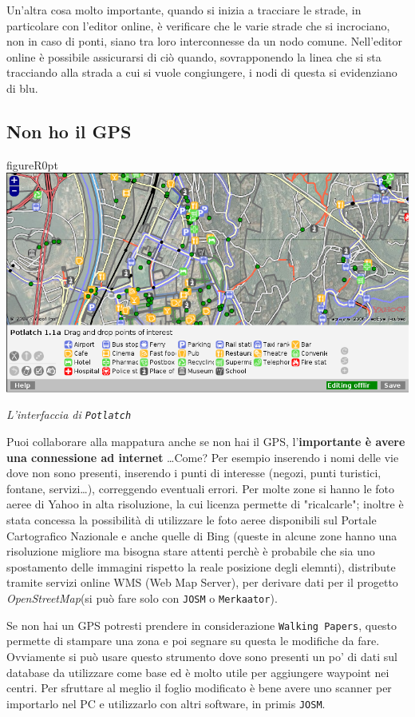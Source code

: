 \documentclass[a4paper,twoside,12pt,]{article}
\newcommand{\osm}{\emph{OpenStreetMap}\xspace}
\newcommand{\gps}{GPS\xspace}
\newcommand{\soft}[1]{\texttt{#1}}
\begin{document}
Un'altra cosa molto importante, quando si inizia a tracciare le strade, in particolare con l'editor online, è verificare che le varie strade che si incrociano, non in caso di ponti, siano tra loro interconnesse da un nodo comune. Nell'editor online è possibile assicurarsi di ciò quando, sovrapponendo la linea che si sta tracciando alla strada a cui si vuole congiungere, i nodi di questa si evidenziano di blu.
\subsection{Non ho il \gps}
\begin{wrapfloat}{figure}{R}{0pt}
 \includegraphics[width=0.7\columnwidth]{potlatch.png}
 \caption{\textit{L'interfaccia di \soft{Potlatch}}}
\end{wrapfloat}
Puoi collaborare alla mappatura anche se non hai il \gps, l'\textbf{importante è avere una connessione ad internet} \dots Come? Per esempio inserendo i nomi delle vie dove non sono presenti, inserendo i punti di interesse (negozi, punti turistici, fontane, servizi\dots), correggendo eventuali errori. Per molte zone si hanno le foto aeree di Yahoo in alta risoluzione, la cui licenza permette di "ricalcarle"; inoltre è stata concessa la possibilità di utilizzare le foto aeree disponibili sul Portale Cartografico Nazionale e anche quelle di Bing (queste in alcune zone hanno una risoluzione migliore ma bisogna stare attenti perchè è probabile che sia uno spostamento delle immagini rispetto la reale posizione degli elemnti), distribute tramite servizi online WMS (Web Map Server), per derivare dati per il progetto \osm (si può fare solo con \soft{JOSM} o \soft{Merkaator}). 

Se non hai un \gps potresti prendere in considerazione \soft{Walking Papers}, questo permette di stampare una zona e poi segnare su questa le modifiche da fare. Ovviamente si può usare questo strumento dove sono presenti un po' di dati sul database da utilizzare come base ed è molto utile per aggiungere waypoint nei centri. Per sfruttare al meglio il foglio modificato è bene avere uno scanner per importarlo nel PC e utilizzarlo con altri software, in primis \soft{JOSM}.
\end{document}
